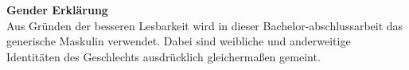 \newpage
\noindent\begin{minipage}[c][.99\textheight][c]{\textwidth}
	\centering
	\begin{minipage}{.65\linewidth}
		\textbf{Gender Erklärung}\\
		\newline
		Aus Gründen der besseren Lesbarkeit wird in dieser Bachelor-abschlussarbeit das generische Maskulin verwendet. Dabei sind weibliche und anderweitige Identitäten des Geschlechts ausdrücklich gleichermaßen gemeint.
	\end{minipage}
\end{minipage}